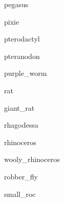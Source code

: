 \documentclass[letterpaper,serif]{module}
\begin{document}
\begin{newmonster}{pegasus}\end{newmonster}

\begin{newmonster}{pixie}\end{newmonster}


\begin{newmonster}{pterodactyl}\end{newmonster}

\begin{newmonster}{pteranodon}\end{newmonster}

\begin{newmonster}{purple_worm}\end{newmonster}


\begin{newmonster}{rat}\end{newmonster}

\begin{newmonster}{giant_rat}\end{newmonster}

\begin{newmonster}{rhagodessa}\end{newmonster}


\begin{newmonster}{rhinoceros}\end{newmonster}

\begin{newmonster}{wooly_rhinoceros}\end{newmonster}

\begin{newmonster}{robber_fly}\end{newmonster}


\begin{newmonster}{small_roc}\end{newmonster}
\end{document}
